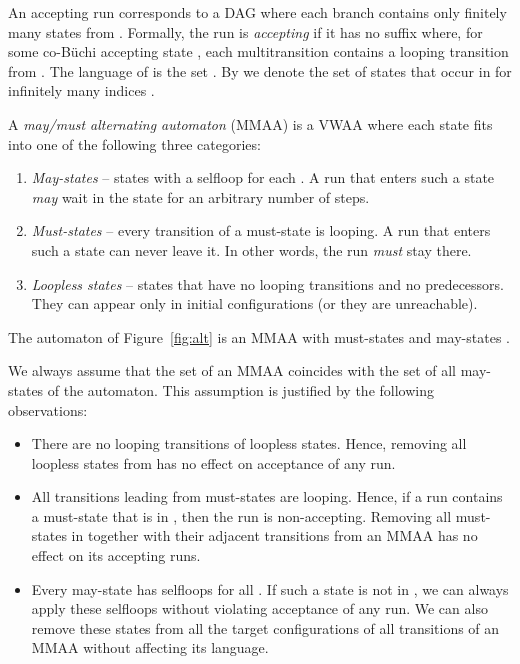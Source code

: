 \documentclass{llncs}
\begin{document}
An accepting run corresponds to a DAG where each branch contains only
finitely many states from .  Formally, the run  is \emph{accepting}
if it has no suffix where, for some co-B\"{u}chi accepting state ,
each multitransition contains a looping transition from . The language of
 is the set .  By  we denote the set of states that
occur in  for infinitely many indices .





\begin{definition}\label{def:mmaa}
  A \emph{may/must alternating automaton} (MMAA)
  is a VWAA where each state fits into one of the following three
  categories:
  \begin{enumerate}
  \item \emph{May-states} -- states with a selfloop for each
    .  A run that enters such a state \emph{may} wait in
    the state for an arbitrary number of steps.
  \item \emph{Must-states} -- every transition of a must-state is looping. A
    run that enters such a state can never leave it. In other words, the run
    \emph{must} stay there.
  \item \emph{Loopless states} -- states that have no looping transitions
    and no predecessors. They can appear only in initial configurations (or
    they are unreachable).
  \end{enumerate}
\end{definition}

The automaton of Figure~\ref{fig:alt} is an MMAA with must-states
 and may-states .

We always assume that the set  of an MMAA coincides with the set of all may-states of the automaton.  This
assumption is justified by the following observations:
\begin{itemize}
\item There are no looping transitions of loopless states. Hence,
  removing all loopless states from  has no effect on acceptance of
  any run.
\item All transitions leading from must-states are looping. Hence, if a
  run contains a must-state that is in , then the run is
  non-accepting.  Removing all must-states in  together with their
  adjacent transitions from an MMAA has no effect on its accepting runs.
\item Every may-state has selfloops for all . If such a
  state is not in , we can always apply these selfloops without violating
  acceptance of any run. We can also remove these states from all the target
  configurations of all transitions of an MMAA without affecting its
  language.
\end{itemize}
\end{document}
